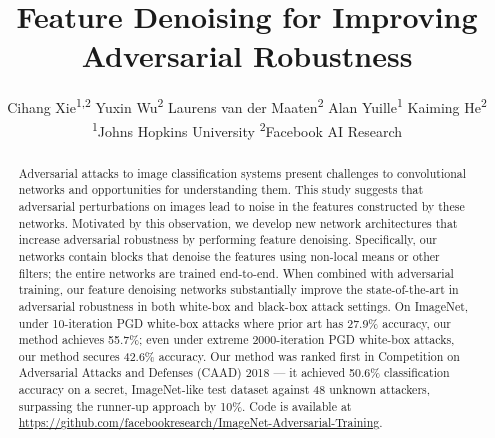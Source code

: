 \documentclass[10pt,twocolumn,letterpaper]{article}
\begin{document}
\title{Feature Denoising for Improving Adversarial Robustness}

\author{
Cihang Xie\textsuperscript{1,2}\footnotemark \qquad
Yuxin Wu\textsuperscript{2} \qquad
Laurens van der Maaten\textsuperscript{2} \qquad
Alan Yuille\textsuperscript{1} \qquad
Kaiming He\textsuperscript{2} \vspace{.3em}\\
\textsuperscript{1}Johns Hopkins University \qquad\qquad \textsuperscript{2}Facebook AI Research
\vspace{-.5em}
}

\maketitle
 \renewcommand*{\thefootnote}{\fnsymbol{footnote}}
 \setcounter{footnote}{1}
 \renewcommand*{\thefootnote}{\arabic{footnote}}
 \setcounter{footnote}{0}





\begin{abstract}
\vspace{-0.3cm}
Adversarial attacks to image classification systems present challenges to convolutional networks and opportunities for understanding them.
This study suggests that adversarial perturbations on images lead to noise in the features constructed by these networks. Motivated by this observation, we develop new network architectures that increase adversarial robustness by performing feature denoising. Specifically, our networks contain blocks that denoise the features using non-local means or other filters; the entire networks are trained end-to-end. When combined with adversarial training, our feature denoising networks substantially improve the state-of-the-art in adversarial robustness in both white-box and black-box attack settings.
On ImageNet, under 10-iteration PGD white-box attacks where prior art has 27.9\% accuracy, 
our method achieves 55.7\%; even under extreme 2000-iteration PGD white-box attacks, our method secures 42.6\% accuracy.
Our method was ranked first in Competition on Adversarial Attacks and Defenses (CAAD) 2018 --- it achieved 50.6\% classification accuracy on a secret, ImageNet-like test dataset against 48 unknown attackers, surpassing the runner-up approach by 10\%. Code is available at \url{https://github.com/facebookresearch/ImageNet-Adversarial-Training}.
\end{abstract}
\end{document}
